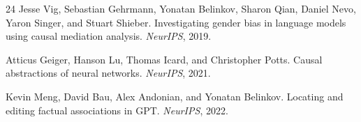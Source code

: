 \documentclass[11pt]{article}
\begin{document}
\begin{thebibliography}{24}
Jesse Vig, Sebastian Gehrmann, Yonatan Belinkov, Sharon Qian, Daniel Nevo, Yaron Singer, and Stuart Shieber.
\newblock Investigating gender bias in language models using causal mediation analysis.
\newblock \emph{NeurIPS}, 2019.

Atticus Geiger, Hanson Lu, Thomas Icard, and Christopher Potts.
\newblock Causal abstractions of neural networks.
\newblock \emph{NeurIPS}, 2021.

Kevin Meng, David Bau, Alex Andonian, and Yonatan Belinkov.
\newblock Locating and editing factual associations in {GPT}.
\newblock \emph{NeurIPS}, 2022.

\end{thebibliography}
\end{document}

